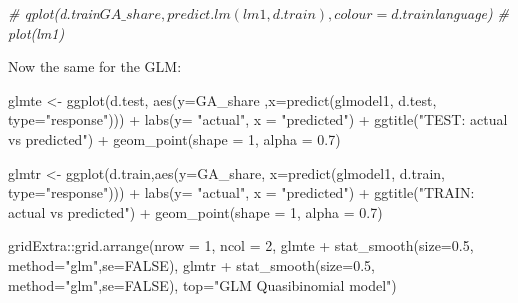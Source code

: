 \documentclass[
]{article}
\newenvironment{Shaded}{\begin{snugshade}}{\end{snugshade}}
\newcommand{\AttributeTok}[1]{\textcolor[rgb]{0.77,0.63,0.00}{#1}}
\newcommand{\CommentTok}[1]{\textcolor[rgb]{0.56,0.35,0.01}{\textit{#1}}}
\newcommand{\ConstantTok}[1]{\textcolor[rgb]{0.00,0.00,0.00}{#1}}
\newcommand{\DecValTok}[1]{\textcolor[rgb]{0.00,0.00,0.81}{#1}}
\newcommand{\FloatTok}[1]{\textcolor[rgb]{0.00,0.00,0.81}{#1}}
\newcommand{\FunctionTok}[1]{\textcolor[rgb]{0.00,0.00,0.00}{#1}}
\newcommand{\NormalTok}[1]{#1}
\newcommand{\OtherTok}[1]{\textcolor[rgb]{0.56,0.35,0.01}{#1}}
\newcommand{\SpecialCharTok}[1]{\textcolor[rgb]{0.00,0.00,0.00}{#1}}
\newcommand{\StringTok}[1]{\textcolor[rgb]{0.31,0.60,0.02}{#1}}
\begin{document}
\begin{Shaded}
\begin{Highlighting}[]
\CommentTok{\# qplot(d.train$GA\_share, predict.lm(lm1, d.train), colour = d.train$language)}
\CommentTok{\# plot(lm1)}
\end{Highlighting}
\end{Shaded}

Now the same for the GLM:

\begin{Shaded}
\begin{Highlighting}[]
\NormalTok{glmte }\OtherTok{\textless{}{-}} \FunctionTok{ggplot}\NormalTok{(d.test, }\FunctionTok{aes}\NormalTok{(}\AttributeTok{y=}\NormalTok{GA\_share ,}\AttributeTok{x=}\FunctionTok{predict}\NormalTok{(glmodel1, d.test, }\AttributeTok{type=}\StringTok{"response"}\NormalTok{))) }\SpecialCharTok{+}
  \FunctionTok{labs}\NormalTok{(}\AttributeTok{y=} \StringTok{"actual"}\NormalTok{, }\AttributeTok{x =} \StringTok{"predicted"}\NormalTok{) }\SpecialCharTok{+} \FunctionTok{ggtitle}\NormalTok{(}\StringTok{"TEST: actual vs predicted"}\NormalTok{) }\SpecialCharTok{+} 
  \FunctionTok{geom\_point}\NormalTok{(}\AttributeTok{shape =} \DecValTok{1}\NormalTok{, }\AttributeTok{alpha =} \FloatTok{0.7}\NormalTok{)}

\NormalTok{glmtr }\OtherTok{\textless{}{-}} \FunctionTok{ggplot}\NormalTok{(d.train,}\FunctionTok{aes}\NormalTok{(}\AttributeTok{y=}\NormalTok{GA\_share, }\AttributeTok{x=}\FunctionTok{predict}\NormalTok{(glmodel1, d.train, }\AttributeTok{type=}\StringTok{"response"}\NormalTok{))) }\SpecialCharTok{+}
  \FunctionTok{labs}\NormalTok{(}\AttributeTok{y=} \StringTok{"actual"}\NormalTok{, }\AttributeTok{x =} \StringTok{"predicted"}\NormalTok{) }\SpecialCharTok{+} \FunctionTok{ggtitle}\NormalTok{(}\StringTok{"TRAIN: actual vs predicted"}\NormalTok{) }\SpecialCharTok{+} 
  \FunctionTok{geom\_point}\NormalTok{(}\AttributeTok{shape =} \DecValTok{1}\NormalTok{, }\AttributeTok{alpha =} \FloatTok{0.7}\NormalTok{)}

\NormalTok{gridExtra}\SpecialCharTok{::}\FunctionTok{grid.arrange}\NormalTok{(}\AttributeTok{nrow =} \DecValTok{1}\NormalTok{, }\AttributeTok{ncol =} \DecValTok{2}\NormalTok{, }
\NormalTok{                        glmte }\SpecialCharTok{+} \FunctionTok{stat\_smooth}\NormalTok{(}\AttributeTok{size=}\FloatTok{0.5}\NormalTok{, }\AttributeTok{method=}\StringTok{"glm"}\NormalTok{,}\AttributeTok{se=}\ConstantTok{FALSE}\NormalTok{),}
\NormalTok{                        glmtr }\SpecialCharTok{+} \FunctionTok{stat\_smooth}\NormalTok{(}\AttributeTok{size=}\FloatTok{0.5}\NormalTok{, }\AttributeTok{method=}\StringTok{"glm"}\NormalTok{,}\AttributeTok{se=}\ConstantTok{FALSE}\NormalTok{),}
                        \AttributeTok{top=}\StringTok{"GLM Quasibinomial model"}\NormalTok{)}
\end{Highlighting}
\end{Shaded}
\end{document}
